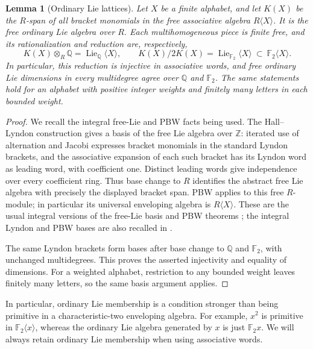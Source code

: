 \documentclass[11pt]{article}
\newtheorem{lemma}[theorem]{Lemma}
\theoremstyle{definition}
\theoremstyle{remark}
\numberwithin{equation}{section}
\begin{document}
\begin{samepage}
\begin{lemma}[Ordinary Lie lattices]\label{lem:lie-lattice}
Let \(X\) be a finite alphabet, and let \(K(X)\) be the \(R\)-span of
all bracket monomials in the free associative algebra
\(R\langle X\rangle\).  It is the free ordinary Lie algebra over \(R\).
Each multihomogeneous piece is finite free, and its rationalization and
reduction are, respectively,
\[
 K(X)\otimes_R\mathbb Q=\operatorname{Lie}_{\mathbb Q}\langle X\rangle,
 \qquad
 K(X)/2K(X)=\operatorname{Lie}_{{\mathbb F_2}}\langle X\rangle
       \ \subset\ {\mathbb F_2}\langle X\rangle.
\]
In particular, this reduction is injective in associative words, and
free ordinary Lie dimensions in every multidegree agree over \(\mathbb Q\)
and \({\mathbb F_2}\).  The same statements hold for an alphabet with positive
integer weights and finitely many letters in each bounded weight.
\end{lemma}
\end{samepage}
\begin{proof}
We recall the integral free-Lie and PBW facts being used.  The
Hall--Lyndon construction gives a basis of the free Lie algebra over
\(\mathbb Z\): iterated use of alternation and Jacobi expresses bracket
monomials in the standard Lyndon brackets, and the associative
expansion of each such bracket has its Lyndon word as leading word,
with coefficient one.  Distinct leading words give independence over
every coefficient ring.  Thus base change to \(R\) identifies the
abstract free Lie algebra with precisely the displayed bracket span.
PBW applies to this free \(R\)-module; in particular its universal
enveloping algebra is \(R\langle X\rangle\).  These are the usual
integral versions of the free-Lie basis and PBW theorems
\cite[Theorems~0.2, 0.5, 4.9 and~5.1]{Reutenauer};
the integral Lyndon and PBW bases are also recalled in
\cite[Section~2]{MelanconReutenauer}.

The same Lyndon brackets form bases after base change to $\mathbb Q$ and
${\mathbb F_2}$, with unchanged multidegrees.  This proves the asserted
injectivity and equality of dimensions.  For a weighted alphabet,
restriction to any bounded weight leaves finitely many letters,
so the same basis argument applies.
\end{proof}

In particular, ordinary Lie membership is a condition stronger than
being primitive in a characteristic-two enveloping algebra.  For
example, \(x^2\) is primitive in \({\mathbb F_2}\langle x\rangle\), whereas the
ordinary Lie algebra generated by \(x\) is just \({\mathbb F_2} x\).  We will
always retain ordinary Lie membership when using associative words.
\end{document}
